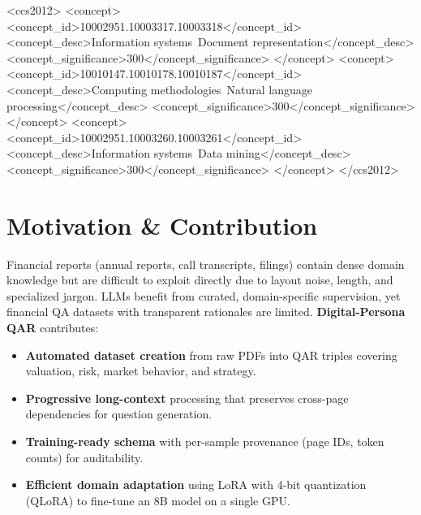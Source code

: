 \documentclass[sigconf,authordraft,anonymous]{acmart}
\begin{document}
\begin{CCSXML}
<ccs2012>
 <concept>
  <concept_id>10002951.10003317.10003318</concept_id>
  <concept_desc>Information systems~Document representation</concept_desc>
  <concept_significance>300</concept_significance>
 </concept>
 <concept>
  <concept_id>10010147.10010178.10010187</concept_id>
  <concept_desc>Computing methodologies~Natural language processing</concept_desc>
  <concept_significance>300</concept_significance>
 </concept>
 <concept>
  <concept_id>10002951.10003260.10003261</concept_id>
  <concept_desc>Information systems~Data mining</concept_desc>
  <concept_significance>300</concept_significance>
 </concept>
</ccs2012>
\end{CCSXML}



\maketitle

\section{Motivation \& Contribution}
Financial reports (annual reports, call transcripts, filings) contain dense domain knowledge but are difficult to exploit directly due to layout noise, length, and specialized jargon. LLMs benefit from curated, domain-specific supervision, yet financial QA datasets with transparent rationales are limited. \textbf{Digital-Persona QAR} contributes:
\begin{itemize}
  \item \textbf{Automated dataset creation} from raw PDFs into QAR triples covering valuation, risk, market behavior, and strategy.
  \item \textbf{Progressive long-context} processing that preserves cross-page dependencies for question generation.
  \item \textbf{Training-ready schema} with per-sample provenance (page IDs, token counts) for auditability.
  \item \textbf{Efficient domain adaptation} using LoRA with 4-bit quantization (QLoRA) to fine-tune an 8B model on a single GPU.
\end{itemize}
\end{document}
